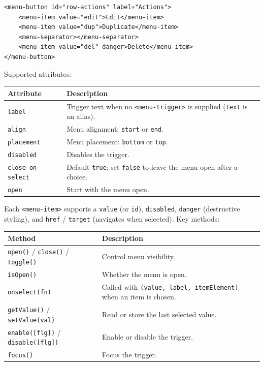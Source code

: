 \begin{lstlisting}[style=html]
<menu-button id="row-actions" label="Actions">
    <menu-item value="edit">Edit</menu-item>
    <menu-item value="dup">Duplicate</menu-item>
    <menu-separator></menu-separator>
    <menu-item value="del" danger>Delete</menu-item>
</menu-button>
\end{lstlisting}

\noindent
Supported attributes:

\begin{longtable}{P{3.8cm}P{6.7cm}}
\toprule
\textbf{Attribute} & \textbf{Description} \\
\midrule
\endhead
\texttt{label} & Trigger text when no \texttt{<menu-trigger>} is supplied (\texttt{text} is an alias). \\
\texttt{align} & Menu alignment: \texttt{start} or \texttt{end}. \\
\texttt{placement} & Menu placement: \texttt{bottom} or \texttt{top}. \\
\texttt{disabled} & Disables the trigger. \\
\texttt{close-on-select} & Default \texttt{true}; set \texttt{false} to leave the menu open after a choice. \\
\texttt{open} & Start with the menu open. \\
\bottomrule
\end{longtable}

\noindent
Each \texttt{<menu-item>} supports a \texttt{value} (or \texttt{id}), \texttt{disabled}, \texttt{danger} (destructive styling), and \texttt{href} / \texttt{target} (navigates when selected).  Key methods:

\begin{longtable}{P{4.8cm}P{5.7cm}}
\toprule
\textbf{Method} & \textbf{Description} \\
\midrule
\endhead
\texttt{open()} / \texttt{close()} / \texttt{toggle()} & Control menu visibility. \\
\texttt{isOpen()} & Whether the menu is open. \\
\texttt{onselect(fn)} & Called with \texttt{(value, label, itemElement)} when an item is chosen. \\
\texttt{getValue()} / \texttt{setValue(val)} & Read or store the last selected value. \\
\texttt{enable([flg])} / \texttt{disable([flg])} & Enable or disable the trigger. \\
\texttt{focus()} & Focus the trigger. \\
\bottomrule
\end{longtable}

